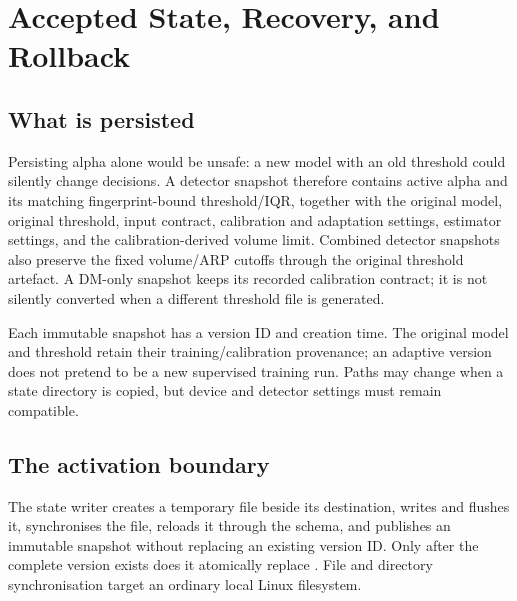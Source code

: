 \section{Accepted State, Recovery, and Rollback}

\subsection{What is persisted}

Persisting alpha alone would be unsafe: a new model with an old threshold could
silently change decisions. A detector snapshot therefore contains active alpha
and its matching fingerprint-bound threshold/IQR, together with the original
model, original threshold, input contract, calibration and adaptation settings,
estimator settings, and the calibration-derived volume limit. Combined detector
snapshots also preserve the fixed volume/ARP cutoffs through the original
threshold artefact. A DM-only snapshot keeps its recorded calibration contract;
it is not silently converted when a different threshold file is generated.

Each immutable snapshot has a version ID and creation time. The original model
and threshold retain their training/calibration provenance; an adaptive version
does not pretend to be a new supervised training run. Paths may change when a
state directory is copied, but device and detector settings must remain
compatible.

\begin{center}
\end{center}

\subsection{The activation boundary}

The state writer creates a temporary file beside its destination, writes and
flushes it, synchronises the file, reloads it through the schema, and publishes
an immutable snapshot without replacing an existing version ID.
Only after the complete version exists does it atomically replace
. File and directory synchronisation target an ordinary local
Linux filesystem.

